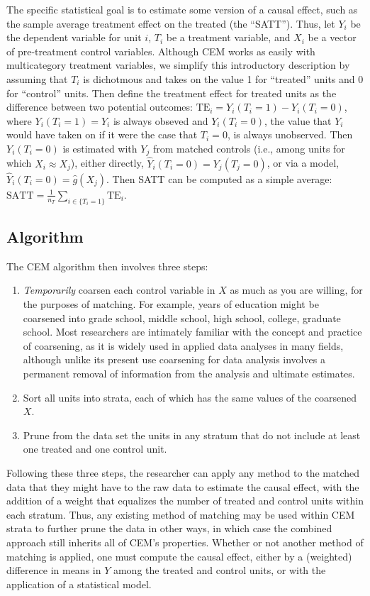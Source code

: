 \documentclass[article]{jss}
\begin{document}
The specific statistical goal is to estimate some version of a causal
effect, such as the sample average treatment effect on the treated
(the ``SATT'').  Thus, let $Y_i$ be the dependent variable for unit
$i$, $T_i$ be a treatment variable, and $X_i$ be a vector of
pre-treatment control variables.  Although CEM works as easily with
multicategory treatment variables, we simplify this introductory
description by assuming that $T_i$ is dichotmous and takes on the
value 1 for ``treated'' units and 0 for ``control'' units.  Then
define the treatment effect for treated units as the difference
between two potential outcomes: $\text{TE}_i = Y_i(T_i=1) -
Y_i(T_i=0)$, where $Y_i(T_i=1) = Y_i$ is always obseved and
$Y_i(T_i=0)$, the value that $Y_i$ would have taken on if it were the
case that $T_i=0$, is always unobserved.  Then $Y_i(T_i=0)$ is
estimated with $Y_j$ from matched controls (i.e., among units for
which $X_i\approx X_j$), either directly, $\hat Y_i(T_i=0) =
Y_j(T_j=0)$, or via a model, $\hat Y_i(T_i=0) = \hat g(X_j)$.  Then
SATT can be computed as a simple average: $\text{SATT} = \frac{1}{n_T}
\sum_{i\in\{T_i=1\}} \text{TE}_i$.

\subsection{Algorithm}
The CEM algorithm then involves three steps:
\begin{enumerate}
\item \emph{Temporarily} coarsen each control variable in $X$ as much
  as you are willing, for the purposes of matching.  For example,
  years of education might be coarsened into grade school, middle
  school, high school, college, graduate school.  Most researchers are
  intimately familiar with the concept and practice of coarsening, as
  it is widely used in applied data analyses in many fields, although
  unlike its present use coarsening for data analysis involves a
  permanent removal of information from the analysis and ultimate
  estimates.

\item Sort all units into strata, each of which has the same values of
  the coarsened $X$.

\item Prune from the data set the units in any stratum that do not
  include at least one treated and one control unit.
\end{enumerate}

Following these three steps, the researcher can apply any method to
the matched data that they might have to the raw data to estimate the
causal effect, with the addition of a weight that equalizes the number
of treated and control units within each stratum.  Thus, any existing
method of matching may be used within CEM strata to further prune the
data in other ways, in which case the combined approach still inherits
all of CEM's properties.  Whether or not another method of matching is
applied, one must compute the causal effect, either by a (weighted)
difference in means in $Y$ among the treated and control units, or
with the application of a statistical model.
\end{document}
